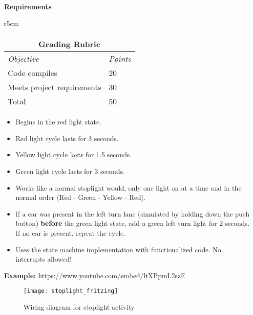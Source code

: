 \documentclass[10pt]{article}
\begin{document}
\noindent\textbf{Requirements}
\begin{wraptable}{r}{5cm}
	\footnotesize
	\centering
	\begin{tabular}{@{}ll@{}}
		\multicolumn{2}{c}{\textbf{Grading Rubric}} \\ \midrule 
		\multicolumn{1}{l}{\textit{Objective}}   & \textit{Points}   \\ \midrule 
		Code compiles                    & 20       \\ \midrule
		Meets project requirements            & 30       \\ \midrule
		Total                            & 50       \\ \bottomrule
	\end{tabular}
\end{wraptable}
\begin{itemize}
	\item Begins in the red light state.
	\item Red light cycle lasts for 3 seconds.
	\item Yellow light cycle lasts for 1.5 seconds.
	\item Green light cycle lasts for 3 seconds.
	\item Works like a normal stoplight would, only one light on at a time and in the
	normal order (Red - Green - Yellow - Red).
	\item If a car was present in the left turn lane (simulated by holding down the push
	button) \textbf{before} the green light state, add a green left turn light for 2
	seconds. If no car is present, repeat the cycle.
	\item Uses the state machine implementation with functionalized code. No interrupts allowed!
\end{itemize}

\textbf{Example: } \url{https://www.youtube.com/embed/ltXPpmL2szE}

\clearpage

\begin{figure}[ht]
	\centering
	\texttt{[image: stoplight\_fritzing]}
	\caption{Wiring diagram for stoplight activity}
	\label{fig:stoplight_wiring_diagram}
\end{figure}
\end{document}
